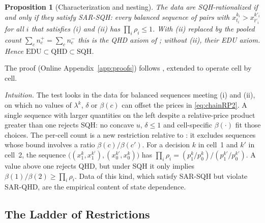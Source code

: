 \documentclass[11pt,a4paper]{article}
\theoremstyle{plain}
\newtheorem{proposition}{Proposition}
\theoremstyle{definition}
\begin{document}
\begin{proposition}[Characterization and nesting]
\label{prop:sqh2}
The data are SQH-rationalized if and only if they satisfy \emph{SAR-SQH}: every balanced sequence of pairs with $x^{k_i}_{t_i}>x^{k'_i}_{t'_i}$ for all $i$ that satisfies (i) and (ii) has $\prod_i\rho_i\le1$. With (ii) replaced by the pooled count $\sum_c n^+_c=\sum_c n^-_c$ this is the QHD axiom of \citet{eis2020}; without (ii), their EDU axiom. Hence $\text{EDU}\subset\text{QHD}\subset\text{SQH}$.
\end{proposition}

\noindent
The proof (Online Appendix~\ref{app:proofs}) follows \citet{eis2020}, extended to operate cell by cell.

\noindent\emph{Intuition.} The test looks in the data for balanced sequences meeting (i) and (ii), on which no values of $\lambda^k$, $\delta$ or $\beta(c)$ can offset the prices in \eqref{eq:chainRP2}. A single sequence with larger quantities on the left despite a relative-price product greater than one rejects SQH: no concave $u$, $\delta\le1$ and cell-specific $\beta(\cdot)$ fit those choices.
The per-cell count is a new restriction relative to \citet{eis2020}: it excludes sequences whose bound involves a ratio $\beta(c)/\beta(c')$. For a decision $k$ in cell~1 and $k'$ in cell~2, the sequence $\big((x^{k}_{1},x^{k'}_{1}),(x^{k'}_{0},x^{k}_{0})\big)$ has $\prod_i\rho_i=(p^k_1/p^k_0)/(p^{k'}_1/p^{k'}_0)$. A value above one rejects QHD, but under SQH it only implies $\beta(1)/\beta(2)\geq\prod_i\rho_i$. Data of this kind, which satisfy SAR-SQH but violate SAR-QHD, are the empirical content of state dependence.


\clearpage




\subsection{The Ladder of Restrictions}
\label{subsec:rungladder}


\end{document}
